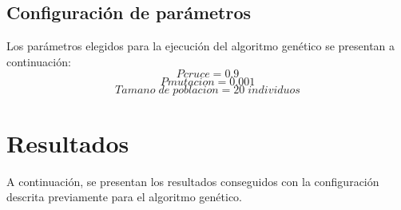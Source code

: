 \documentclass[11pt]{article}
\begin{document}
\subsection{Configuraci\'on de par\'ametros}
Los par\'ametros elegidos para la ejecuci\'on del algoritmo gen\'etico se presentan a continuaci\'on:
\begin{equation}
Pcruce = 0.9
\end{equation}
\begin{equation}
Pmutacion = 0.001
\end{equation}
\begin{equation}
Tamano\;de\;poblacion = 20\;individuos
\end{equation}

\section{Resultados}
A continuaci\'on, se presentan los resultados conseguidos con la configuraci\'on
descrita previamente para el algoritmo gen\'etico.
\end{document}
